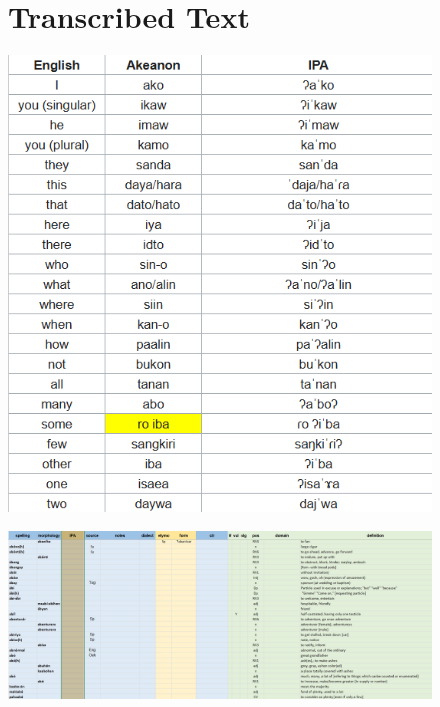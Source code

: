 \begin{figure}[h!]
\section{Transcribed Text}
	\centering
	\includegraphics[width=\textwidth]{prelim_transcription.png}
	\label{fig:transcription1}
\end{figure}

\begin{figure}[h!]
	\centering
	\includegraphics[width=\textwidth]{dictionary.png}
	\label{fig:trans}
\end{figure}



